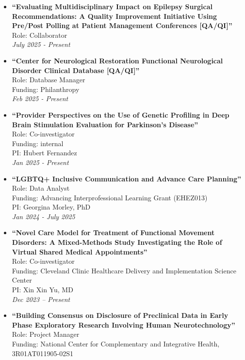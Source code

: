 \documentclass[
  letterpaper,
  DIV=11,
  numbers=noendperiod]{scrartcl}
\begin{document}
\begin{itemize}
\item
  \textbf{``Evaluating Multidisciplinary Impact on Epilepsy Surgical
  Recommendations: A Quality Improvement Initiative Using Pre/Post
  Polling at Patient Management Conferences {[}QA/QI{]}''}\\
  Role: Collaborator\\
  \emph{July 2025 - Present}
\item
  \textbf{``Center for Neurological Restoration Functional Neurological
  Disorder Clinical Database {[}QA/QI{]}''}\\
  Role: Database Manager\\
  Funding: Philanthropy\\
  \emph{Feb 2025 - Present}
\item
  \textbf{``Provider Perspectives on the Use of Genetic Profiling in
  Deep Brain Stimulation Evaluation for Parkinson's Disease''}\\
  Role: Co-investigator\\
  Funding: internal\\
  PI: Hubert Fernandez\\
  \emph{Jan 2025 - Present}
\item
  \textbf{``LGBTQ+ Inclusive Communication and Advance Care
  Planning''}\\
  Role: Data Analyst\\
  Funding: Advancing Interprofessional Learning Grant (EHEZ013)\\
  PI: Georgina Morley, PhD\\
  \emph{Jan 2024 - July 2025}
\item
  \textbf{``Novel Care Model for Treatment of Functional Movement
  Disorders: A Mixed-Methods Study Investigating the Role of Virtual
  Shared Medical Appointments''}\\
  Role: Co-investigator\\
  Funding: Cleveland Clinic Healthcare Delivery and Implementation
  Science Center\\
  PI: Xin Xin Yu, MD\\
  \emph{Dec 2023 -- Present}
\item
  \textbf{``Building Consensus on Disclosure of Preclinical Data in
  Early Phase Exploratory Research Involving Human Neurotechnology''}\\
  Role: Project Manager\\
  Funding: National Center for Complementary and Integrative Health,
  3R01AT011905-02S1\\

\end{itemize}
\end{document}
